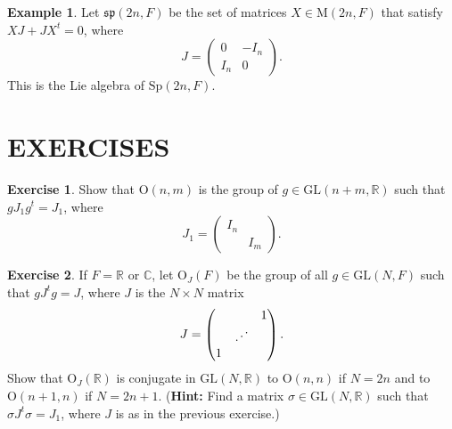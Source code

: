 \documentclass[12pt,reqno]{book}%
\theoremstyle{definition}
\newtheorem{example}{Example}[chapter]
\newtheorem{exercise}{Exercise}[chapter]
\theoremstyle{remark}
\theoremstyle{theorem}
\theoremstyle{remark}
\begin{document}
\begin{example}\label{}
    Let $\mathfrak{sp}(2n, F)$ be the set of matrices $X \in \mathrm{M}(2n, F)$ that satisfy $XJ + JX^t = 0$, where
    \[
        J = \begin{pmatrix}
            0 & -I_n  \\
            I_n & 0
        \end{pmatrix}
        .
    \]
    This is the Lie algebra of $\mathrm{Sp}(2n, F)$.
\end{example}

\section*{EXERCISES}%
\begin{exercise}\label{}
    Show that $\mathrm{O}(n, m)$ is the group of $g \in \mathrm{GL}(n + m, \mathbb{R})$ such that $gJ_1 g^t = J_1$, where
    \[
        J_1 = \begin{pmatrix}
            I_n &   \\
            & I_m
        \end{pmatrix}.
    \]
\end{exercise}

\begin{exercise}\label{}
    If $F = \mathbb{R}$ or $\mathbb{C}$, let $\mathrm{O}_J(F)$ be the group of all $g \in \mathrm{GL}(N, F)$ such that $gJ^tg = J$, where $J$ is the $N \times N$ matrix
    \begin{equation}\label{eqexc5.2}
        J = %
        \renewcommand\arraystretch{1}
        \begin{pmatrix}
            &  & 1 \\ %
            & \iddots &  \\
            1 &  &
        \end{pmatrix}.
    \end{equation}
    Show that $\mathrm{O}_J(\mathbb{R})$ is conjugate in $\mathrm{GL}(N, \mathbb{R})$ to $\mathrm{O}(n, n)$ if $N = 2n$ and to $\mathrm{O}(n + 1, n)$ if $N = 2n + 1$.
    (\textbf{Hint:} Find a matrix $\sigma \in \mathrm{GL}(N, \mathbb{R})$ such that $\sigma J^t \sigma = J_1$, where $J$ is as in the previous exercise.)
\end{exercise}
\end{document}
